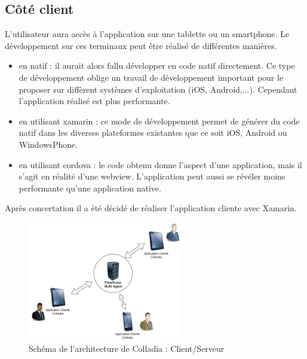 \documentclass[a4paper,11pt]{article}
\begin{document}
\subsection{Côté client}
L'utilisateur aura accès à l'application sur une tablette ou un smartphone.  
Le développement sur ces terminaux peut être réalisé de différentes manières.
\begin{itemize}
\item en natif : il aurait alors fallu développer en code natif directement. Ce type de développement oblige un travail de développement important pour le proposer sur diffèrent systèmes d'exploitation (iOS, Android,...). Cependant l'application réalisé est plus performante.
\item en utilisant xamarin : ce mode de développement permet de générer du code natif dans les diverses plateformes existantes que ce soit iOS, Android ou WindowsPhone. 
\item en utilisant cordova : le code obtenu donne l'aspect d'une application, mais il s'agit en réalité d'une webview. L'application peut aussi se révéler moins performante qu'une application native.

\end{itemize}

Après concertation il a été décidé de réaliser l'application cliente avec Xamarin.
\begin{figure}[!h]
	\centering
	\includegraphics[width=0.6\textwidth]{img/Archi}
	\caption{Schéma de l'architecture de Colladia : Client/Serveur}
\end{figure}

\end{document}

